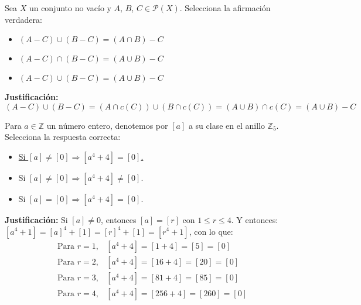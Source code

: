 \documentclass[12pt]{article}
\begin{document}
    \begin{ejercicio}
        Sea $X$ un conjunto no vacío y $A$, $B$, $C \in \mathcal{P}(X)$. Selecciona la afirmación verdadera:
        \begin{itemize}
            \item $(A-C) \cup (B-C) = (A\cap B)-C$
            \item $(A-C) \cap (B-C) = (A\cup B)-C$
            \item \underline{$(A-C) \cup (B-C) = (A\cup B)-C$}
        \end{itemize}
        \textbf{Justificación:}\newline
        $$(A-C)\cup (B-C) = (A \cap c(C)) \cup (B \cap c(C)) = (A \cup B)\cap c(C) = (A \cup B) - C$$
    \end{ejercicio}

    \begin{ejercicio}
        Para $a \in \mathbb{Z}$ un número entero, denotemos por $[a]$ a su clase en el anillo $\mathbb{Z}_5$. Selecciona la respuesta correcta:
        \begin{itemize}
            \item \underline{Si $[a] \neq [0] \Rightarrow [a^4+4] = [0]$.}
            \item Si $[a] \neq [0] \Rightarrow [a^4+4] \neq [0]$.
            \item Si $[a] = [0] \Rightarrow [a^4+4] = [0]$.
        \end{itemize}
        \textbf{Justificación:}\newline
        Si $[a] \neq 0$, entonces $[a] = [r]$ con $1 \leq r \leq 4$.\newline
        Y entonces: $[a^4+1] = [a]^4 + [1] = [r]^4 +[1] = [r^4 +1]$, con lo que:
        $$\begin{array}{rl}
            \mbox{Para } r=1, & [a^4+4] = [1+4] = [5] = [0] \\
            \mbox{Para } r=2, & [a^4+4] = [16+4] = [20] = [0] \\
            \mbox{Para } r=3, & [a^4+4] = [81+4] = [85] = [0] \\
            \mbox{Para } r=4, & [a^4+4] = [256+4] = [260] = [0]
        \end{array}$$
    \end{ejercicio}
\end{document}
